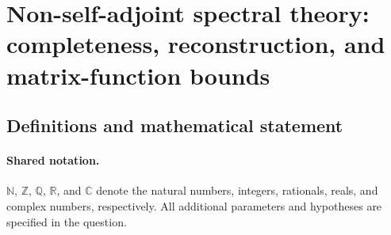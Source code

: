 \documentclass[11pt]{article}
\begin{document}
\section{Non-self-adjoint spectral theory: completeness, reconstruction, and matrix-function bounds}\label{statement}

\subsection{Definitions and mathematical statement}

\paragraph{Shared notation.}$\mathbb N$, $\mathbb Z$, $\mathbb Q$, $\mathbb R$, and $\mathbb C$ denote the natural numbers, integers, rationals, reals, and complex numbers, respectively. All additional parameters and hypotheses are specified in the question.
\end{document}
